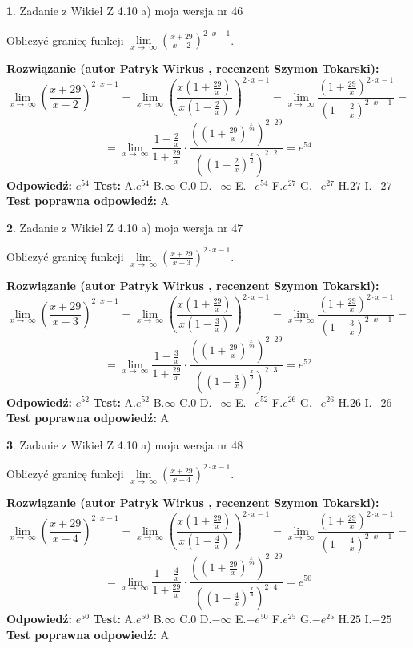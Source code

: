 \documentclass[12pt, a4paper]{article}
\theoremstyle{definition} %
\newtheorem{zad}{}
\newcommand{\zadStart}[1]{\begin{zad}#1\newline}
\newcommand{\zadStop}{\end{zad}}
\newcommand{\rozwStart}[2]{\noindent \textbf{Rozwiązanie (autor #1 , recenzent #2): }\newline}
\newcommand{\rozwStop}{\newline}
\newcommand{\odpStart}{\noindent \textbf{Odpowiedź:}\newline}
\newcommand{\odpStop}{\newline}
\newcommand{\testStart}{\noindent \textbf{Test:}\newline}
\newcommand{\testStop}{\newline}
\newcommand{\kluczStart}{\noindent \textbf{Test poprawna odpowiedź:}\newline}
\newcommand{\kluczStop}{\newline}
\begin{document}
\zadStart{Zadanie z Wikieł Z 4.10 a) moja wersja nr 46}

Obliczyć granicę funkcji  $\lim\limits_{x\to\ \infty}(\frac{x+29}{x-2})^{2\cdot x-1}$.
\zadStop
\rozwStart{Patryk Wirkus}{Szymon Tokarski}
$$\lim\limits_{x\to\ \infty}(\frac{x+29}{x-2})^{2\cdot x-1} = \lim\limits_{x\to\ \infty}(\frac{x(1+\frac{29}{x})}{x(1-\frac{2}{x})})^{2\cdot x-1}=\lim\limits_{x\to\ \infty}\frac{(1+\frac{29}{x})^{2\cdot x-1}}{(1-\frac{2}{x})^{2\cdot x-1}}=$$
$$=\lim\limits_{x\to\ \infty}\frac{1-\frac{2}{x}}{1+\frac{29}{x}}\cdot\frac{((1+\frac{29}{x})^{\frac{x}{29}})^{2\cdot29}}{((1-\frac{2}{x})^{\frac{x}{2}})^{2\cdot2}}=e^{54}$$
\rozwStop
\odpStart
$e^{54}$
\odpStop
\testStart
A.$e^{54}$ B.$\infty$ C.$0$ D.$-\infty$ E.$-e^{54}$
F.$e^{27}$ G.$-e^{27}$
H.$27$
I.$-27$
\testStop
\kluczStart
A
\kluczStop



\zadStart{Zadanie z Wikieł Z 4.10 a) moja wersja nr 47}

Obliczyć granicę funkcji  $\lim\limits_{x\to\ \infty}(\frac{x+29}{x-3})^{2\cdot x-1}$.
\zadStop
\rozwStart{Patryk Wirkus}{Szymon Tokarski}
$$\lim\limits_{x\to\ \infty}(\frac{x+29}{x-3})^{2\cdot x-1} = \lim\limits_{x\to\ \infty}(\frac{x(1+\frac{29}{x})}{x(1-\frac{3}{x})})^{2\cdot x-1}=\lim\limits_{x\to\ \infty}\frac{(1+\frac{29}{x})^{2\cdot x-1}}{(1-\frac{3}{x})^{2\cdot x-1}}=$$
$$=\lim\limits_{x\to\ \infty}\frac{1-\frac{3}{x}}{1+\frac{29}{x}}\cdot\frac{((1+\frac{29}{x})^{\frac{x}{29}})^{2\cdot29}}{((1-\frac{3}{x})^{\frac{x}{3}})^{2\cdot3}}=e^{52}$$
\rozwStop
\odpStart
$e^{52}$
\odpStop
\testStart
A.$e^{52}$ B.$\infty$ C.$0$ D.$-\infty$ E.$-e^{52}$
F.$e^{26}$ G.$-e^{26}$
H.$26$
I.$-26$
\testStop
\kluczStart
A
\kluczStop



\zadStart{Zadanie z Wikieł Z 4.10 a) moja wersja nr 48}

Obliczyć granicę funkcji  $\lim\limits_{x\to\ \infty}(\frac{x+29}{x-4})^{2\cdot x-1}$.
\zadStop
\rozwStart{Patryk Wirkus}{Szymon Tokarski}
$$\lim\limits_{x\to\ \infty}(\frac{x+29}{x-4})^{2\cdot x-1} = \lim\limits_{x\to\ \infty}(\frac{x(1+\frac{29}{x})}{x(1-\frac{4}{x})})^{2\cdot x-1}=\lim\limits_{x\to\ \infty}\frac{(1+\frac{29}{x})^{2\cdot x-1}}{(1-\frac{4}{x})^{2\cdot x-1}}=$$
$$=\lim\limits_{x\to\ \infty}\frac{1-\frac{4}{x}}{1+\frac{29}{x}}\cdot\frac{((1+\frac{29}{x})^{\frac{x}{29}})^{2\cdot29}}{((1-\frac{4}{x})^{\frac{x}{4}})^{2\cdot4}}=e^{50}$$
\rozwStop
\odpStart
$e^{50}$
\odpStop
\testStart
A.$e^{50}$ B.$\infty$ C.$0$ D.$-\infty$ E.$-e^{50}$
F.$e^{25}$ G.$-e^{25}$
H.$25$
I.$-25$
\testStop
\kluczStart
A
\kluczStop
\end{document}
